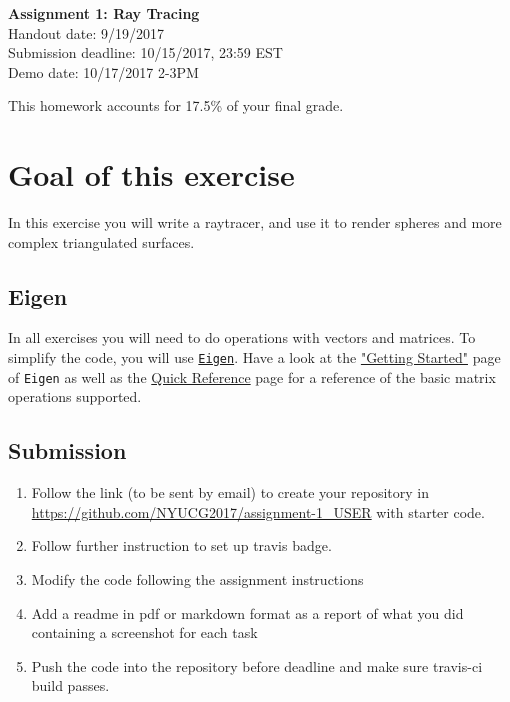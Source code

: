 \documentclass[11pt]{article}
\begin{document}
\hspace{50pt}

\begin{center}

{\Huge \textbf{Assignment 1: Ray Tracing}}\\
\vspace{10pt}
Handout date: 9/19/2017\\
Submission deadline: 10/15/2017,  23:59 EST\\
Demo date: 10/17/2017 2-3PM 
\end{center}

\noindent This homework accounts for 17.5\% of your final grade. 

\section*{Goal of this exercise}
In this exercise you will write a raytracer, and use it to render spheres and more complex triangulated surfaces.

\subsection*{Eigen}
In all exercises you will need to do operations with vectors and matrices. To simplify the code, you will use \href{http://eigen.tuxfamily.org/}{\texttt{Eigen}}. 
Have a look at the \href{http://eigen.tuxfamily.org/dox/GettingStarted.html}{"Getting Started"} page of \texttt{Eigen} as well as the \href{http://eigen.tuxfamily.org/dox/group__QuickRefPage.html}{Quick Reference} page for a reference of the basic matrix operations supported. 

\subsection*{Submission}

\begin{enumerate}
\item Follow the link (to be sent by email) to create your repository in \url{https://github.com/NYUCG2017/assignment-1_USER} with starter code.
\item Follow further instruction to set up travis badge.
\item Modify the code following the assignment instructions
\item Add a readme in pdf or markdown format as a report of what you did containing a screenshot for each task
\item Push the code into the repository before deadline and make sure travis-ci build passes.
\end{enumerate}
\end{document}
